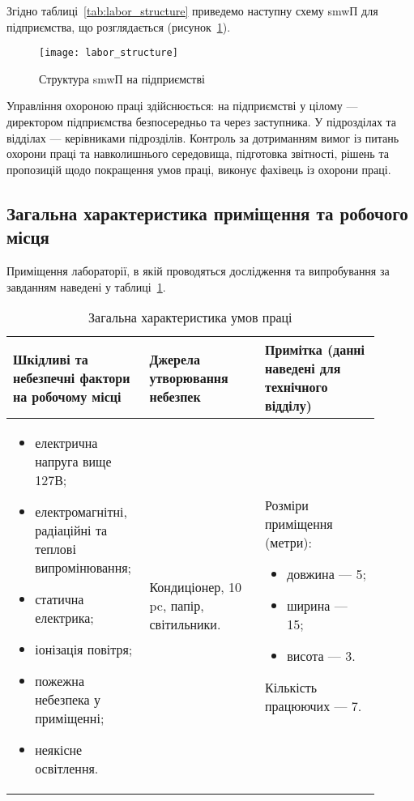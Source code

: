 Згідно таблиці~\ref{tab:labor_structure} приведемо наступну схему \acrshort{smw}П для підприємства, що розглядається (рисунок~\ref{fig:labor_structure}).

\begin{figure}[H]
	\centering
	\texttt{[image: labor\_structure]}
	\caption{Структура \acrshort{smw}П на підприємстві}
	\label{fig:labor_structure}
\end{figure} 

Управління охороною праці здійснюється: на підприємстві у цілому --- директором підприємства безпосередньо та через заступника. 
У підрозділах та відділах --- керівниками підрозділів.
Контроль за дотриманням вимог із питань охорони праці та навколишнього середовища, підготовка звітності, рішень та пропозицій щодо покращення умов праці, виконує фахівець із охорони праці.

\subsection{Загальна характеристика приміщення та робочого місця}
Приміщення лабораторії, в якій проводяться дослідження та випробування за завданням наведені у таблиці~\ref{tab:labor_charactristics}.

\begin{table}[H]
	\caption{Загальна характеристика умов праці}
	\label{tab:labor_charactristics}
	\begin{tabular}{@{}|p{0.3\linewidth}|p{0.3\linewidth}|p{0.3\linewidth}|@{}}
	 	\hline
		Шкідливі та небезпечні фактори на робочому місці & Джерела утворювання небезпек & Примітка (данні наведені для технічного відділу) \\ \hline
		\begin{itemize}[leftmargin=*]
			\item електрична напруга вище 127В; 
			\item електромагнітні, радіаційні та теплові випромінювання; 
			\item статична електрика;
			\item іонізація повітря; 
			\item пожежна небезпека у приміщенні; 
			\item неякісне освітлення.
		\end{itemize}
		&
		Кондиціонер, 10 \acrshort{pc}, папір, світильники.
		&
		Розміри приміщення (метри):
		\begin{itemize}
			\item довжина --- 5;
			\item ширина --- 15;
			\item висота --- 3.
		\end{itemize} 
		Кількість працюючих --- 7.
		\\ \hline
	\end{tabular}
\end{table}

